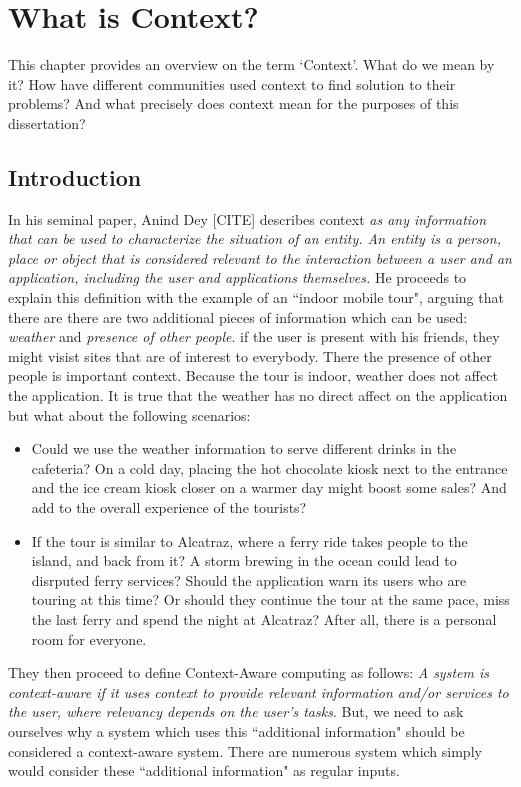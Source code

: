 \chapter{What is Context?}

This chapter provides an overview on the term `Context'. What do we mean by it? How have different communities used context to find solution to their problems? And what precisely does context mean for the purposes of this dissertation?

\section{Introduction}

In his seminal paper, Anind Dey [CITE] describes context \textit{as any information that can be used to characterize the situation of an entity. An entity is a person, place or object that is considered relevant to the interaction between a user and an application, including the user and applications themselves.} He proceeds to explain this definition with the example of an ``indoor mobile tour", arguing that there are there are two additional pieces of information which can be used: \textit{weather} and \textit{presence of other people}. if the user is present with his friends, they might visist sites that are of interest to everybody. There the presence of other people is important context. Because the tour is indoor, weather does not affect the application. It is true that the weather has no direct affect on the application but what about the following scenarios:

\begin{itemize}
\item Could we use the weather information to serve different drinks in the cafeteria? On a cold day, placing the hot chocolate kiosk next to the entrance and the ice cream kiosk closer on a warmer day might boost some sales? And add to the overall experience of the tourists?
\item If the tour is similar to Alcatraz, where a ferry ride takes people to the island, and back from it? A storm brewing in the ocean could lead to disrputed ferry services? Should the application warn its users who are touring at this time? Or should they continue the tour at the same pace, miss the last ferry and spend the night at Alcatraz? After all, there is a personal room for everyone.
\end{itemize}

They then proceed to define Context-Aware computing as follows: \textit{A system is context-aware if it uses context to provide relevant information and/or services to the user, where relevancy depends on the user's tasks}. But, we need to ask ourselves why a system which uses this ``additional information" should be considered a context-aware system. There are numerous system which simply would consider these ``additional information" as regular inputs. 

